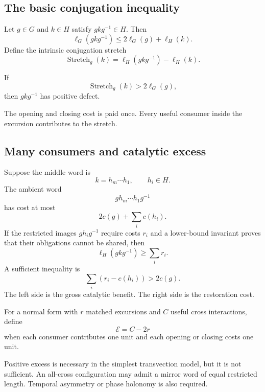\subsection{The basic conjugation inequality}
Let $g\in G$ and $k\in H$ satisfy $gkg^{-1}\in H$.  Then
\[
\ell_G(gkg^{-1})
\le 2\ell_G(g)+\ell_H(k).
\]
Define the intrinsic conjugation stretch
\[
\operatorname{Stretch}_g(k)
=
\ell_H(gkg^{-1})-\ell_H(k).
\]

\begin{proposition}
If
\[
\operatorname{Stretch}_g(k)>2\ell_G(g),
\]
then $gkg^{-1}$ has positive defect.
\end{proposition}
The opening and closing cost is paid once.  Every useful consumer inside the excursion contributes to the stretch.

\subsection{Many consumers and catalytic excess}
Suppose the middle word is
\[
k=h_m\cdots h_1,
\qquad h_i\in H.
\]
The ambient word
\[
gh_m\cdots h_1g^{-1}
\]
has cost at most
\[
2c(g)+\sum_i c(h_i).
\]
If the restricted images $gh_ig^{-1}$ require costs $r_i$ and a lower-bound invariant proves that their obligations cannot be shared, then
\[
\ell_H(gkg^{-1})\ge\sum_i r_i.
\]
A sufficient inequality is
\[
\sum_i(r_i-c(h_i))>2c(g).
\]
The left side is the gross catalytic benefit.  The right side is the restoration cost.

\begin{definition}
For a normal form with $r$ matched excursions and $C$ useful cross interactions, define
\[
\mathcal E=C-2r
\]
when each consumer contributes one unit and each opening or closing costs one unit.
\end{definition}
Positive excess is necessary in the simplest transvection model, but it is not sufficient.  An all-cross configuration may admit a mirror word of equal restricted length.  Temporal asymmetry or phase holonomy is also required.

